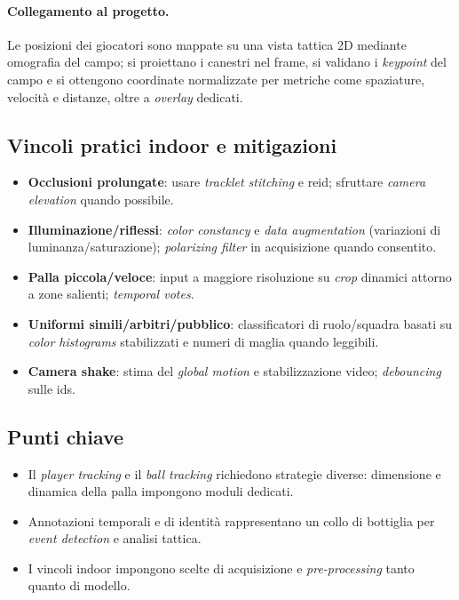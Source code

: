 \documentclass[12pt,a4paper,openright,twoside]{book}
\begin{document}
\paragraph{Collegamento al progetto.} Le posizioni dei giocatori 
sono mappate su una vista tattica 2D mediante omografia del campo;
si proiettano i canestri nel frame, si validano i \emph{keypoint} del 
campo e si ottengono coordinate normalizzate per metriche come
spaziature, velocità e distanze, oltre a \emph{overlay} dedicati.


\subsection{Vincoli pratici indoor e mitigazioni}
\begin{itemize}
  \item \textbf{Occlusioni prolungate}: usare \emph{tracklet stitching} 
  e \ac{reid}; sfruttare \emph{camera elevation} quando possibile.
  \item \textbf{Illuminazione/riflessi}: \emph{color constancy} e 
  \emph{data augmentation} (variazioni di luminanza/saturazione); 
  \emph{polarizing filter} in acquisizione quando consentito.
  \item \textbf{Palla piccola/veloce}: input a maggiore risoluzione 
  su \emph{crop} dinamici attorno a zone salienti; \emph{temporal votes}.
  \item \textbf{Uniformi simili/arbitri/pubblico}: classificatori di 
  ruolo/squadra basati su \emph{color histograms} stabilizzati e numeri 
  di maglia quando leggibili.
  \item \textbf{Camera shake}: stima del \emph{global motion} e 
  stabilizzazione video; \emph{debouncing} sulle \acp{id}.
\end{itemize}


\subsection*{Punti chiave}
\begin{itemize}
  \item Il \emph{player tracking} e il \emph{ball tracking} 
  richiedono strategie diverse: dimensione e dinamica della 
  palla impongono moduli dedicati.
  \item Annotazioni temporali e di identità rappresentano 
  un collo di bottiglia per \emph{event detection} e analisi tattica.
  \item I vincoli indoor impongono scelte di acquisizione e 
  \emph{pre-processing} tanto quanto di modello.
\end{itemize}
\end{document}
